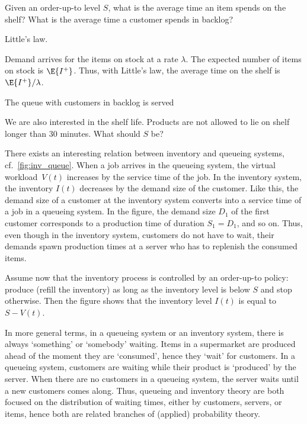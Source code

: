 \begin{exercise}
 Given an order-up-to level $S$, what is the average time an item spends on the shelf? What is the average time a customer spends in backlog?
 \begin{hint}
 Little's law.
 \end{hint}
 \begin{solution}
 Demand arrives for the items on stock at a rate $\lambda$. The expected number of items on stock is $\E{I^+}$. Thus, with Little's law, the average time on the shelf is $\E{I^+}/\lambda$. 

 The queue with customers in backlog is served

 \end{solution}

 We are also interested in the shelf life. Products are not allowed to lie on shelf longer than 30 minutes. What should $S$ be? 
\end{exercise}





There exists an interesting relation between inventory and queueing systems, cf.~\cref{fig:inv_queue}.
When a job arrives in the queueing system, the virtual workload~$V(t)$ increases by the service time of the job.
In the inventory system, the inventory $I(t)$ decreases by the demand size of the customer.
Like this, the demand size of a customer at the inventory system converts into a service time of a job in a queueing system.
In the figure, the demand size $D_1$ of the first customer corresponds to a production time of duration $S_1=D_1$, and so on.
Thus, even though in the inventory system, customers do not have to wait, their demands spawn production times at a server who has to replenish the consumed items.

Assume now that the inventory process is controlled by an order-up-to policy: produce (refill the inventory) as long as the inventory level is below $S$ and stop otherwise. Then the figure shows that the inventory level $I(t)$ is equal to $S-V(t)$. 

In more general terms, in a queueing system or an inventory system, there is always `something' or `somebody' waiting. Items in a supermarket are produced ahead of the moment they are `consumed', hence they `wait' for customers. In a queueing system, customers are waiting while their product is `produced' by the server. When there are no customers in a queueing system, the server waits until a new customers comes along. Thus, queueing and inventory theory are both focused on the distribution of waiting times, either by customers, servers, or items, hence both are related branches of (applied) probability theory.


